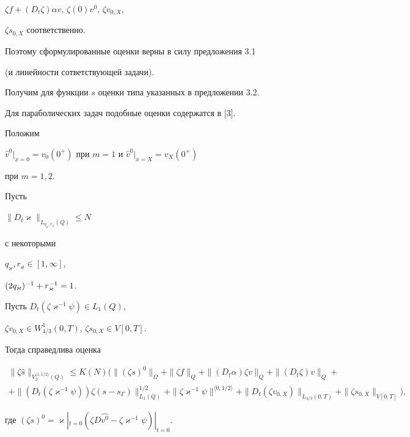$\zeta f+(D_t\zeta)\alpha v$, $\zeta(0)v^0$, $\zeta v_{0,X}$,


$\zeta s_{0,X}$ соответственно.


Поэтому сформулированные оценки верны в силу предложения 3.1


(и линейности сответствующей задачи).








Получим для функции $s$ оценки типа указанных в предложении 3.2.


Для параболических задач подобные оценки содержатся в [3].





Положим


$\widehat v^0|_{x=0}=v_0(0^+)$ при $m=1$ и $\widehat v^0|_{x=X}=v_X(0^+)$


при $m=1,2$.





\begin{props} Пусть


$\|D_t\varkappa\|_{L_{q_\varkappa,r_\varkappa}(Q)}\le N$


с некоторыми


$q_\varkappa,r_\varkappa\in [1,\infty]$,


$(2q_\varkappa)^{-1}+\linebreak r_\varkappa^{-1}=1$.


Пусть $D_t(\zeta\varkappa^{-1}\psi)\in L_1(Q)$,


$\zeta v_{0,X}\in W_{4/3}^1(0,T)$, $\zeta s_{0,X}\in V[0,T]$.


Тогда справедлива оценка


\begin{multline}


\|\zeta\widehat s\|_{V_2^{\langle 1,1/2\rangle}(Q)}


\le K(N)\big(\|(\zeta s)^0\|_\Omega +


\|\zeta f\|_Q +\|(D_t\alpha)\zeta v\|_Q


+\|(D_t\zeta)v\|_Q +\\


+\|(D_t(\zeta\varkappa^{-1}\psi))\zeta (s-s_{\Gamma})\|^{1/2}_{L_1(Q)}+


\|\zeta\varkappa^{-1}\psi\|^{\langle 0,1/2\rangle}


+\|D_t(\zeta v_{0,X})\|_{L_{4/3}(0,T)}+


\|\zeta s_{0,X}\|_{V[0,T]}\big),


\end{multline}


где $(\zeta s)^0=\varkappa|_{t=0}(\zeta D\widehat{v^0}-


\zeta\varkappa^{-1}\psi)|_{t=0}$.


\end{props}





